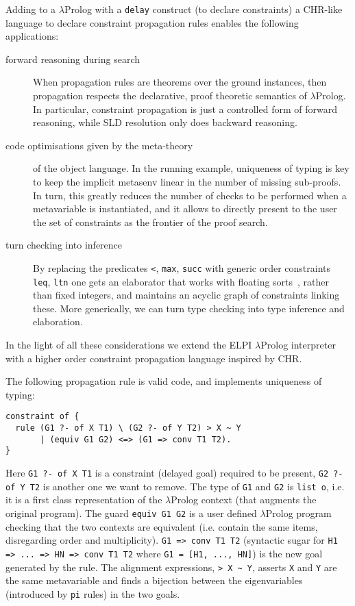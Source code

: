 \documentclass{easychair}
\begin{document}
Adding to a $\lambda$Prolog with a \verb+delay+ construct (to declare constraints) a CHR-like language to declare constraint propagation rules
enables the following applications:
\begin{description}
\item[forward reasoning during search] When propagation rules are theorems
        over the ground instances,
	then propagation respects the declarative, proof theoretic semantics
        of $\lambda$Prolog. In particular, constraint propagation is just a
        controlled form of forward reasoning, while SLD resolution only
	does backward reasoning.
\item[code optimisations given by the meta-theory] of the object
	language.  In the running example, uniqueness of typing is key to keep
	the implicit metasenv linear in the number of missing sub-proofs.
        In turn, this greatly reduces the number of checks to be performed when
        a metavariable is instantiated, and it allows to directly present to
        the user the set of constraints as the frontier of the proof search.
\item[turn checking into inference]  By replacing the
	predicates \verb+<+, \verb+max+, \verb+succ+ with generic 
	order constraints
	\verb+leq+, \verb+ltn+ one gets an elaborator that works with 
	floating sorts~\cite{algebraic},
	rather than fixed integers, and maintains an acyclic graph of
	constraints linking these. More generically, we can turn type checking into type inference and elaboration.
\end{description}

In the light of all these considerations we extend the ELPI
$\lambda$Prolog interpreter with a higher order constraint propagation
language inspired by CHR.

The following propagation rule is valid code, and implements
uniqueness of typing:

\begin{Verbatim}
constraint of {
  rule (G1 ?- of X T1) \ (G2 ?- of Y T2) > X ~ Y
       | (equiv G1 G2) <=> (G1 => conv T1 T2).
}
\end{Verbatim}

Here \verb+G1 ?- of X T1+ is a constraint (delayed goal) required
to be present, \verb+G2 ?- of Y T2+ is another one we want to remove.
The type of \verb+G1+ and \verb+G2+ is \verb+list o+, i.e.
it is a first class representation of the $\lambda$Prolog context
(that augments the original program).  
The guard \verb+equiv G1 G2+ is a user defined $\lambda$Prolog program
checking that the two contexts are equivalent (i.e.
contain the same items, disregarding order and multiplicity).  \verb+G1 => conv T1 T2+ (syntactic sugar for \verb+H1 => ... => HN => conv T1 T2+ where
\verb+G1 = [H1, ..., HN]+) is the new goal generated by the rule.
The alignment expressions, \verb+> X ~ Y+, asserts \verb+X+ and \verb+Y+
are the same metavariable and finds a bijection between the
eigenvariables (introduced by \verb+pi+ rules) in the two goals.
\end{document}
